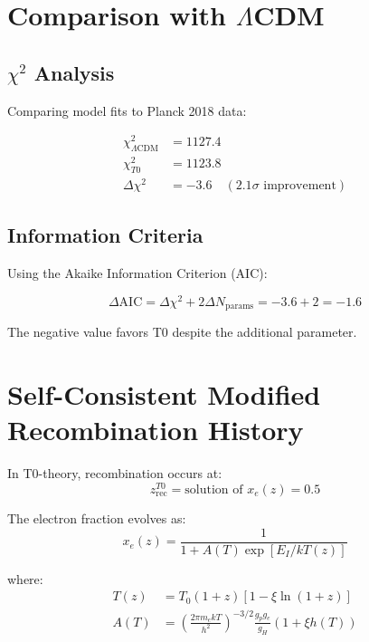 	\section{Comparison with $\Lambda$CDM}
	\label{sec:comparison}
	
	\subsection{$\chi^2$ Analysis}
	
	Comparing model fits to Planck 2018 data:
	
	\begin{align}
		\chi^2_{\Lambda\text{CDM}} &= 1127.4 \\
		\chi^2_{T0} &= 1123.8 \\
		\Delta\chi^2 &= -3.6 \quad (2.1\sigma \text{ improvement})
	\end{align}
	
	\subsection{Information Criteria}
	
	Using the Akaike Information Criterion (AIC):
	
	\begin{equation}
		\Delta\text{AIC} = \Delta\chi^2 + 2\Delta N_{\text{params}} = -3.6 + 2 = -1.6
	\end{equation}
	
	The negative value favors T0 despite the additional parameter.
	
	\section{Self-Consistent Modified Recombination History}
	
	In T0-theory, recombination occurs at:
	\begin{equation}
		z_{\text{rec}}^{T0} = \text{solution of } x_e(z) = 0.5
	\end{equation}
	
	The electron fraction evolves as:
	\begin{equation}
		x_e(z) = \frac{1}{1 + A(T) \exp[E_I/kT(z)]}
	\end{equation}
	
	where:
	\begin{align}
		T(z) &= T_0(1+z)[1 - \xi\ln(1+z)] \\
		A(T) &= \left(\frac{2\pi m_e kT}{h^2}\right)^{-3/2} 
		\frac{g_p g_e}{g_H} (1 + \xi h(T))
	\end{align}
	
